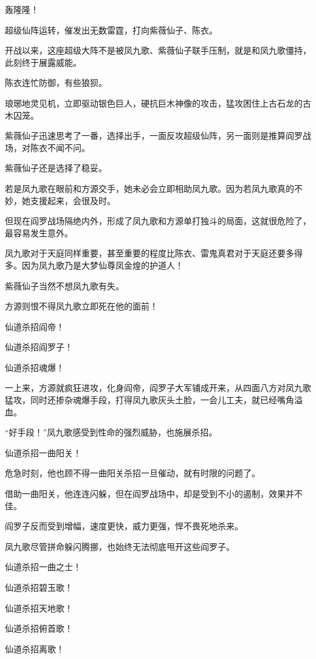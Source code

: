 
\begin{this_body}

轰隆隆！

超级仙阵运转，催发出无数雷霆，打向紫薇仙子、陈衣。

开战以来，这座超级大阵不是被凤九歌、紫薇仙子联手压制，就是和凤九歌僵持，此刻终于展露威能。

陈衣连忙防御，有些狼狈。

琅琊地灵见机，立即驱动银色巨人，硬抗巨木神像的攻击，猛攻困住上古石龙的古木囚笼。

紫薇仙子迅速思考了一番，选择出手，一面反攻超级仙阵，另一面则是推算阎罗战场，对陈衣不闻不问。

紫薇仙子还是选择了稳妥。

若是凤九歌在眼前和方源交手，她未必会立即相助凤九歌。因为若凤九歌真的不妙，她支援起来，会很及时。

但现在阎罗战场隔绝内外，形成了凤九歌和方源单打独斗的局面，这就很危险了，最容易发生意外。

凤九歌对于天庭同样重要，甚至重要的程度比陈衣、雷鬼真君对于天庭还要多得多。因为凤九歌乃是大梦仙尊凤金煌的护道人！

紫薇仙子当然不想凤九歌有失。

方源则恨不得凤九歌立即死在他的面前！

仙道杀招阎帝！

仙道杀招阎罗子！

仙道杀招魂爆！

一上来，方源就疯狂进攻，化身阎帝，阎罗子大军铺成开来，从四面八方对凤九歌猛攻，同时还掺杂魂爆手段，打得凤九歌灰头土脸，一会儿工夫，就已经嘴角溢血。

“好手段！”凤九歌感受到性命的强烈威胁，也施展杀招。

仙道杀招一曲阳关！

危急时刻，他也顾不得一曲阳关杀招一旦催动，就有时限的问题了。

借助一曲阳关，他连连闪躲，但在阎罗战场中，却是受到不小的遏制，效果并不佳。

阎罗子反而受到增幅，速度更快，威力更强，悍不畏死地杀来。

凤九歌尽管拼命躲闪腾挪，也始终无法彻底甩开这些阎罗子。

仙道杀招一曲之士！

仙道杀招碧玉歌！

仙道杀招天地歌！

仙道杀招俯首歌！

仙道杀招离歌！


\end{this_body}
